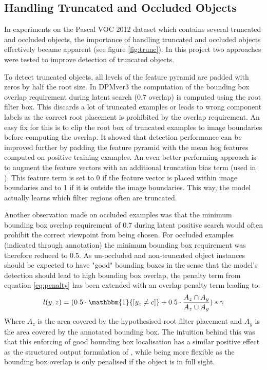 \subsection{Handling Truncated and Occluded Objects}\label{sec:trunc}

In experiments on the Pascal VOC 2012 dataset which contains several truncated and occluded objects, the importance of handling truncated and occluded objects effectively became apparent (see figure \ref{fig:trunc}). In this project two approaches were tested to improve  detection of truncated objects.

To detect truncated objects, all levels of the feature pyramid are padded with zeros by half the root size. In DPMver3 the computation of the bounding box overlap requirement during latent search (0.7 overlap) is computed using the root filter box. This discards a lot of truncated examples or leads to wrong component labels as the correct root placement is prohibited by the overlap requirement. An easy fix for this is to clip the root box of truncated examples to image boundaries before computing the overlap. 
It showed that detection performance can be improved further by padding the feature pyramid with the mean hog features computed on positive training examples. An even better performing approach is to augment the feature vectors with an additional truncation bias term  (used in \cite{voc-release4}). This feature term is set to 0 if the feature vector is placed within image boundaries and to 1 if it is outside the image boundaries. This way, the model actually learns which filter regions often are truncated. 

Another observation made on occluded examples was that the minimum bounding box overlap requirement  of 0.7 during latent positive search would often prohibit the correct viewpoint from being chosen. For occluded examples (indicated through annotation) the minimum bounding box requirement was therefore reduced to 0.5.  
As un-occluded and non-truncated object instances should be expected to have "good" bounding boxes in the sense that the model's detection should lead to high bounding box overlap, the penalty term from equation \ref{eq:penalty} has been extended with an overlap penalty term leading to:
\begin{equation}
l(y,z)=(0.5\cdot\mathbbm{1}{ [y_c\neq c] }+0.5\cdot \frac{A_z\cap A_y}{A_z\cup A_y})*\gamma
\end{equation}
Where $A_z$ is the area covered by the hypothesised root filter placement and $A_y$ is the area covered by the annotated bounding box. The intuition behind this was that this enforcing of good bounding box localisation has a similar positive effect as the structured output formulation of \cite{6248075}, while being more flexible as the bounding box overlap is only penalised if the object is in full sight. 